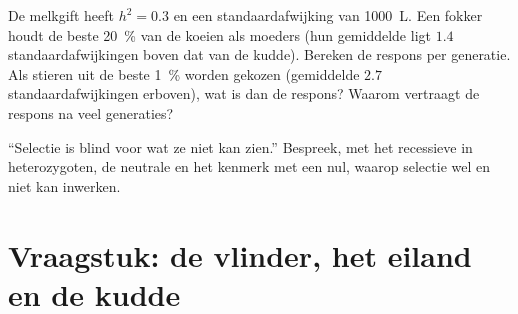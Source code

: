 \begin{exercise}[$\star\star\star$]\label{exo:b2:population-genetics:11}
De melkgift heeft $h^{2} = 0.3$ en een standaardafwijking van
\qty{1000}{L}. Een fokker houdt de beste \qty{20}{\%} van de koeien als
moeders (hun gemiddelde ligt $1.4$ standaardafwijkingen boven dat van de
kudde). Bereken de respons per generatie. Als stieren uit de
beste \qty{1}{\%} worden gekozen (gemiddelde $2.7$ standaardafwijkingen erboven), wat is dan de
respons? Waarom vertraagt de respons na veel generaties?
\end{exercise}

\begin{exercise}[$\star\star\star$]\label{exo:b2:population-genetics:12}
``Selectie is blind voor wat ze niet kan zien.'' Bespreek, met het
recessieve  in heterozygoten, de neutrale  en het
kenmerk met een  nul, waarop selectie wel en niet kan
inwerken.
\end{exercise}

\section{Vraagstuk: de vlinder, het eiland en de kudde}

